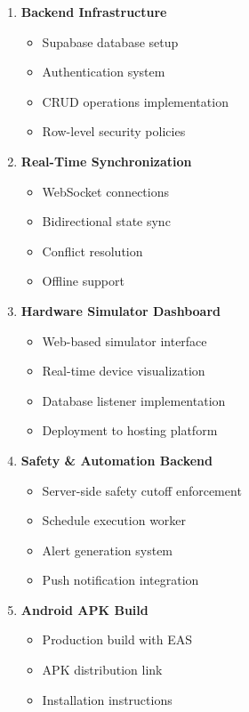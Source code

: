 \documentclass[12pt,a4paper]{article}
\begin{document}
\begin{enumerate}[leftmargin=*]
    \item \textcolor{required}{\textbf{Backend Infrastructure}}
    \begin{itemize}
        \item Supabase database setup
        \item Authentication system
        \item CRUD operations implementation
        \item Row-level security policies
    \end{itemize}
    
    \item \textcolor{required}{\textbf{Real-Time Synchronization}}
    \begin{itemize}
        \item WebSocket connections
        \item Bidirectional state sync
        \item Conflict resolution
        \item Offline support
    \end{itemize}
    
    \item \textcolor{required}{\textbf{Hardware Simulator Dashboard}}
    \begin{itemize}
        \item Web-based simulator interface
        \item Real-time device visualization
        \item Database listener implementation
        \item Deployment to hosting platform
    \end{itemize}
    
    \item \textcolor{required}{\textbf{Safety \& Automation Backend}}
    \begin{itemize}
        \item Server-side safety cutoff enforcement
        \item Schedule execution worker
        \item Alert generation system
        \item Push notification integration
    \end{itemize}
    
    \item \textcolor{required}{\textbf{Android APK Build}}
    \begin{itemize}
        \item Production build with EAS
        \item APK distribution link
        \item Installation instructions
    \end{itemize}
    

\end{enumerate}
\end{document}

